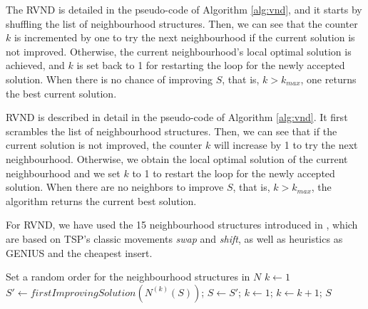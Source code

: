 \documentclass{singlecol-new}
\theoremstyle{TH}{
\newtheorem{lemma}{Lemma}
\newtheorem{theorem}[lemma]{Theorem}
\newtheorem{corrolary}[lemma]{Corrolary}
\newtheorem{conjecture}[lemma]{Conjecture}
\newtheorem{proposition}[lemma]{Proposition}
\newtheorem{claim}[lemma]{Claim}
\newtheorem{stheorem}[lemma]{Wrong Theorem}
}
\theoremstyle{THrm}{
\newtheorem{definition}{Definition}[section]
\newtheorem{question}{Question}[section]
\newtheorem{remark}{Remark}
\newtheorem{scheme}{Scheme}
}
\theoremstyle{THhit}{
\newtheorem{case}{Case}[section]
}
\begin{document}


The RVND is detailed in the pseudo-code of Algorithm \ref{alg:vnd}, and it starts by shuffling the list of neighbourhood structures. Then, we can see that the counter $k$ is incremented by one to try the next neighbourhood if the current solution is not improved.
Otherwise, the current neighbourhood's local optimal solution is achieved, and $k$ is set back to 1 for restarting the loop for the newly accepted solution.
When there is no chance of improving $S$, that is, $k > k_{max}$, one returns the best current solution.

RVND is described in detail in the pseudo-code of Algorithm \ref{alg:vnd}. It first scrambles the list of neighbourhood structures. Then, we can see that if the current solution is not improved, the counter $k$ will increase by 1 to try the next neighbourhood. Otherwise, we obtain the local optimal solution of the current neighbourhood and we set $k$ to 1 to restart the loop for the newly accepted solution. When there are no neighbors to improve $S$, that is, $k> k_{max}$, the algorithm returns the current best solution.




For RVND, we have used the 15 neighbourhood structures introduced in \citet{daSilva}, which are based on TSP's classic movements \textit{swap} and \textit{shift}, as well as heuristics as GENIUS and the cheapest insert.


\begin{algorithm}
	\caption{\hspace{-1mm}: RVND($S, N$)}
	\label{alg:vnd}
		{\footnotesize
	\begin{algorithmic}[1]		
		\STATE  Set a random order for the neighbourhood structures in $N$	
		\STATE $k \gets 1$
		\STATE $S' \gets firstImprovingSolution(N^{(k)}(S))$;
		\STATE $S \gets S'$;
		\STATE $k \gets 1$;
		\ELSE
		\STATE $k \gets k + 1$;
		\ENDIF
		\ENDWHILE
		\RETURN $S$
	\end{algorithmic}	
}
\end{algorithm}
\end{document}

